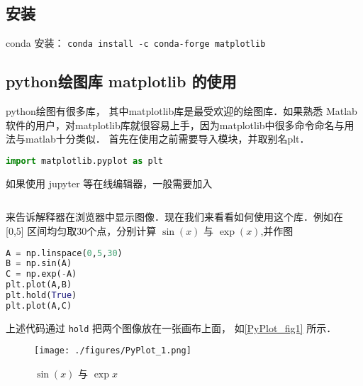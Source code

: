 
\subsection{安装}
conda 安装： \verb|conda install -c conda-forge matplotlib|

\subsection{python绘图库 matplotlib 的使用}

python绘图有很多库， 其中matplotlib库是最受欢迎的绘图库．如果熟悉 Matlab 软件的用户，对matplotlib库就很容易上手，因为matplotlib中很多命令命名与用法与matlab十分类似． 首先在使用之前需要导入模块，并取别名plt．
\begin{lstlisting}[language=python]
import matplotlib.pyplot as plt
\end{lstlisting}
如果使用 jupyter 等在线编辑器，一般需要加入
\begin{lstlisting}[language=python]
% matplotlib inline
\end{lstlisting}
来告诉解释器在浏览器中显示图像．现在我们来看看如何使用这个库．例如在 [0,5] 区间均匀取30个点，分别计算 $\sin(x)$ 与 $\exp(x)$,并作图
\begin{lstlisting}[language=python]
A = np.linspace(0,5,30) 
B = np.sin(A)
C = np.exp(-A)
plt.plot(A,B)
plt.hold(True)
plt.plot(A,C)
\end{lstlisting}
上述代码通过 \verb|hold| 把两个图像放在一张画布上面， 如\autoref{PyPlot_fig1} 所示．
\begin{figure}[ht]
\centering
\texttt{[image: ./figures/PyPlot\_1.png]}
\caption{$\sin(x)$ 与 $\exp{x}$} \label{PyPlot_fig1}
\end{figure}


